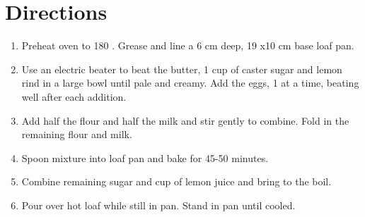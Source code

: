\section*{Directions}
\begin{enumerate}
	\item Preheat oven to 180 \textcelsius . Grease and line a 6 cm deep, 19 x10 cm base loaf pan.
	\item Use an electric beater to beat the butter, 1 cup of caster sugar and lemon rind in a large bowl until pale and creamy.
		Add the eggs, 1 at a time, beating well after each addition.
	\item Add half the flour and half the milk and stir gently to combine. Fold in the remaining flour and milk.
	\item Spoon mixture into loaf pan and bake for 45-50 minutes.
	\item Combine remaining sugar and  cup of lemon juice and bring to the boil.
	\item Pour over hot loaf while still in pan.  Stand in pan until cooled.

\end{enumerate}
